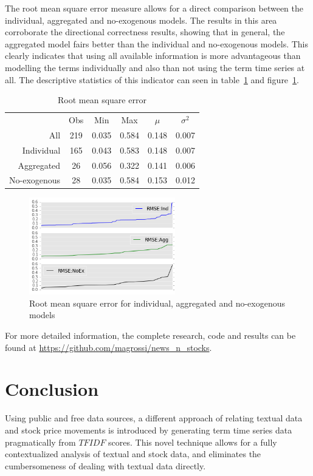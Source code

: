 \documentclass[conference,11pt]{IEEEtran}
\begin{document}
\par
The root mean square error measure allows for a direct comparison between the individual, aggregated and no-exogenous models. The results in this area corroborate the directional correctness results, showing that in general, the aggregated model fairs better than the individual and no-exogenous models. This clearly indicates that using all available information is more advantageous than modelling the terms individually and also than not using the term time series at all. The descriptive statistics of this indicator can seen in table~\ref{tab:1} and figure~\ref{fig:rmse_line}.

\begin{table}
\caption{Root mean square error}
\label{tab:1}
\begin{tabular}{ r c c c c c }
             & Obs   & Min   & Max   & \(\mu\) & \(\sigma^2\) \\
All          & 219   & 0.035 & 0.584 & 0.148   & 0.007 \\ 
Individual   & 165   & 0.043 & 0.583 & 0.148   & 0.007 \\
Aggregated   & 26    & 0.056 & 0.322 & 0.141   & 0.006 \\
No-exogenous & 28    & 0.035 & 0.584 & 0.153   & 0.012 \\
\end{tabular}
\end{table}

\begin{figure}[!htbp]
\centering
\includegraphics[width=2.5in]{rmse_line}
\caption{Root mean square error for individual, aggregated and no-exogenous models}
\label{fig:rmse_line}
\end{figure}

\par
For more detailed information, the complete research, code and results can be found at \url{https://github.com/magrossi/news_n_stocks}.

\section{Conclusion}
Using public and free data sources, a different approach of relating textual data and stock price movements is introduced by generating term time series data pragmatically from \(TFIDF\) scores. This novel technique allows for a fully contextualized analysis of  textual and stock data, and eliminates the cumbersomeness of dealing with textual data directly.
\end{document}
